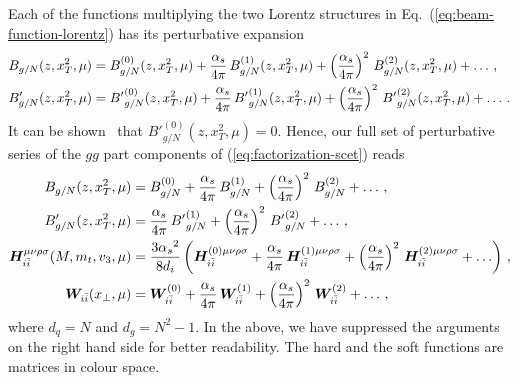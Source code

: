 \documentclass[a4paper,11pt]{report}
\numberwithin{equation}{section}
\begin{document}
Each of the functions multiplying the two Lorentz structures in
Eq.~(\ref{eq:beam-function-lorentz}) has its perturbative expansion
%
\begin{subequations}
  \begin{align}
   B_{g/N}(z,x_T^2,\mu)  &=
   B_{g/N}^{(0)}(z,x_T^2,\mu) + \frac{{\alpha_s}}{4\pi}\,   B_{g/N}^{(1)}(z,x_T^2,\mu) +
   \left(\frac{{\alpha_s}}{4\pi}\right)^2\, B_{g/N}^{(2)}(z,x_T^2,\mu) + \ldots\,,
   \\
   B'_{g/N}(z,x_T^2,\mu) &=
   {B'}_{g/N}^{(0)}(z,x_T^2,\mu) + \frac{{\alpha_s}}{4\pi}\,   {B'}_{g/N}^{(1)}(z,x_T^2,\mu) +
   \left(\frac{{\alpha_s}}{4\pi}\right)^2\, {B'}_{g/N}^{(2)}(z,x_T^2,\mu) + \ldots\,.
  \end{align}
\end{subequations}
%
It can be shown~\cite{AntoniaMTh} that ${B'}_{g/N}^{(0)}(z,x_T^2,\mu) = 0$.
Hence, our full set of perturbative series of the $gg$ part components of
(\ref{eq:factorization-scet}) reads~\cite{Li:2013mia}
%
\begin{subequations}
  \begin{align}
   B_{g/N}(z,x_T^2,\mu)  &=
   B_{g/N}^{(0)} + \frac{{\alpha_s}}{4\pi}\, B_{g/N}^{(1)} + \left(\frac{{\alpha_s}}{4\pi}\right)^2\, B_{g/N}^{(2)} + \ldots\,,
   \\
   B'_{g/N}(z,x_T^2,\mu) &=
   \frac{{\alpha_s}}{4\pi}\,   {B'}_{g/N}^{(1)} + \left(\frac{{\alpha_s}}{4\pi}\right)^2\, {B'}_{g/N}^{(2)} + \ldots\,,
   \\
   \bm{H}^{\mu\nu\rho\sigma}_{i \bar i}(M,m_t,v_3,\mu) &= 
   \frac{3{\alpha_s}^2}{8 d_i}\left(
   \bm{H}^{(0) \mu\nu\rho\sigma}_{i \bar i} + 
   \frac{{\alpha_s}}{4\pi}\, \bm{H}^{(1) \mu\nu\rho\sigma}_{i \bar i} +
   \left(\frac{{\alpha_s}}{4\pi}\right)^2\, 
   \bm{H}^{(2) \mu\nu\rho\sigma}_{i \bar i} + \ldots
   \right)\,,
   \\
   \bm{W}_{i \bar i}(x_\perp,\mu) &=
   \bm{W}^{(0)}_{i \bar i} + \frac{{\alpha_s}}{4\pi}\, \bm{W}^{(1)}_{i \bar i} +
   \left(\frac{{\alpha_s}}{4\pi}\right)^2\, \bm{W}^{(2)}_{i \bar i} + \ldots\,,
  \end{align}
\end{subequations}
%
where $d_q =N $ and $d_g = N^2-1$.
%
In the above, we have suppressed the arguments on the right hand side for better
readability. The hard and the soft functions are matrices in colour space.
\end{document}
